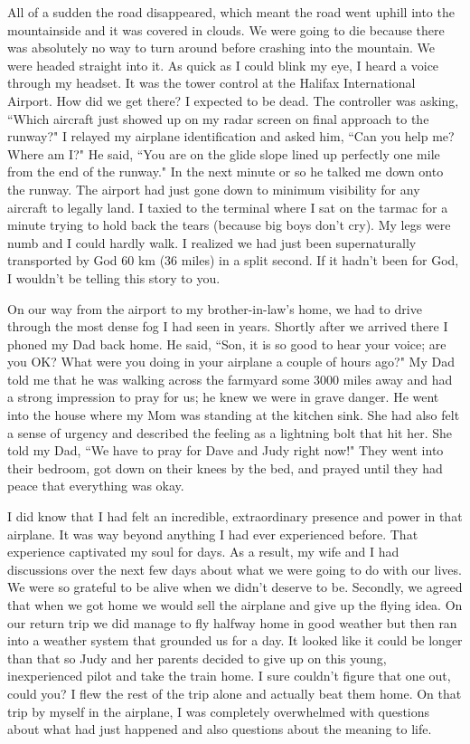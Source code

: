 \documentclass[oneside,12pt]{book}
\begin{document}
All of a sudden the road disappeared, which meant the road went uphill into the mountainside and it was covered in clouds. We were going to die because there was absolutely no way to turn around before crashing into the mountain. We were headed straight into it. As quick as I could blink my eye, I heard a voice through my headset. It was the tower control at the Halifax International Airport. How did we get there? I expected to be dead. The controller was asking, ``Which aircraft just showed up on my radar screen on final approach to the runway?" I relayed my airplane identification and asked him, ``Can you help me? Where am I?" He said, ``You are on the glide slope lined up perfectly one mile from the end of the runway." In the next minute or so he talked me down onto the runway. The airport had just gone down to minimum visibility for any aircraft to legally land. I taxied to the terminal where I sat on the tarmac for a minute trying to hold back the tears (because big boys don't cry). My legs were numb and I could hardly walk. I realized we had just been supernaturally transported by God 60 km (36 miles) in a split second. If it hadn't been for God, I wouldn't be telling this story to you.

On our way from the airport to my brother-in-law's home, we had to drive through the most dense fog I had seen in years. Shortly after we arrived there I phoned my Dad back home. He said, ``Son, it is so good to hear your voice; are you OK? What were you doing in your airplane a couple of hours ago?" My Dad told me that he was walking across the farmyard some 3000 miles away and had a strong impression to pray for us; he knew we were in grave danger. He went into the house where my Mom was standing at the kitchen sink. She had also felt a sense of urgency and described the feeling as a lightning bolt that hit her. She told my Dad, ``We have to pray for Dave and Judy right now!" They went into their bedroom, got down on their knees by the bed, and prayed until they had peace that everything was okay.

I did know that I had felt an incredible, extraordinary presence and power in that airplane. It was way beyond anything I had ever experienced before. That experience captivated my soul for days. As a result, my wife and I had discussions over the next few days about what we were going to do with our lives. We were so grateful to be alive when we didn't deserve to be. Secondly, we agreed that when we got home we would sell the airplane and give up the flying idea. On our return trip we did manage to fly halfway home in good weather but then ran into a weather system that grounded us for a day. It looked like it could be longer than that so Judy and her parents decided to give up on this young, inexperienced pilot and take the train home. I sure couldn't figure that one out, could you? I flew the rest of the trip alone and actually beat them home. On that trip by myself in the airplane, I was completely overwhelmed with questions about what had just happened and also questions about the meaning to life.
\end{document}
